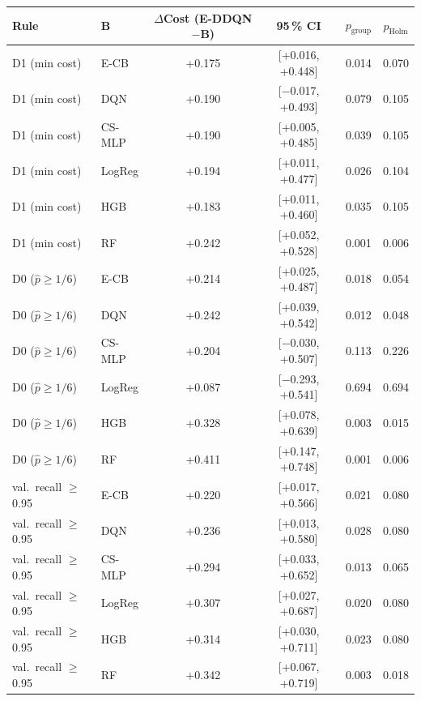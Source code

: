 \begin{tabular}{llcccc}
\toprule
Rule & B & $\Delta$Cost (E-DDQN$-$B) & 95\,\% CI & $p_{\text{group}}$ & $p_{\text{Holm}}$ \\
\midrule
D1 (min cost) & E-CB & +0.175 & [+0.016, +0.448] & 0.014 & 0.070 \\
D1 (min cost) & DQN & +0.190 & [$-$0.017, +0.493] & 0.079 & 0.105 \\
D1 (min cost) & CS-MLP & +0.190 & [+0.005, +0.485] & 0.039 & 0.105 \\
D1 (min cost) & LogReg & +0.194 & [+0.011, +0.477] & 0.026 & 0.104 \\
D1 (min cost) & HGB & +0.183 & [+0.011, +0.460] & 0.035 & 0.105 \\
D1 (min cost) & RF & +0.242 & [+0.052, +0.528] & 0.001 & 0.006 \\
D0 ($\hat p\ge1/6$) & E-CB & +0.214 & [+0.025, +0.487] & 0.018 & 0.054 \\
D0 ($\hat p\ge1/6$) & DQN & +0.242 & [+0.039, +0.542] & 0.012 & 0.048 \\
D0 ($\hat p\ge1/6$) & CS-MLP & +0.204 & [$-$0.030, +0.507] & 0.113 & 0.226 \\
D0 ($\hat p\ge1/6$) & LogReg & +0.087 & [$-$0.293, +0.541] & 0.694 & 0.694 \\
D0 ($\hat p\ge1/6$) & HGB & +0.328 & [+0.078, +0.639] & 0.003 & 0.015 \\
D0 ($\hat p\ge1/6$) & RF & +0.411 & [+0.147, +0.748] & 0.001 & 0.006 \\
val.\ recall $\ge$0.95 & E-CB & +0.220 & [+0.017, +0.566] & 0.021 & 0.080 \\
val.\ recall $\ge$0.95 & DQN & +0.236 & [+0.013, +0.580] & 0.028 & 0.080 \\
val.\ recall $\ge$0.95 & CS-MLP & +0.294 & [+0.033, +0.652] & 0.013 & 0.065 \\
val.\ recall $\ge$0.95 & LogReg & +0.307 & [+0.027, +0.687] & 0.020 & 0.080 \\
val.\ recall $\ge$0.95 & HGB & +0.314 & [+0.030, +0.711] & 0.023 & 0.080 \\
val.\ recall $\ge$0.95 & RF & +0.342 & [+0.067, +0.719] & 0.003 & 0.018 \\
\bottomrule
\end{tabular}

